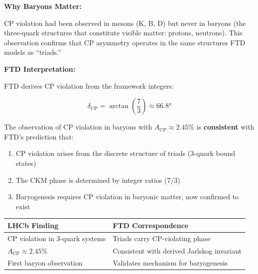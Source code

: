 \documentclass[
  11pt,
  letterpaper,
  twoside,
  openright]{book}
\providecommand{\tightlist}{%
  \setlength{\itemsep}{0pt}\setlength{\parskip}{0pt}}
\begin{document}
\textbf{Why Baryons Matter:}

CP violation had been observed in mesons (K, B, D) but never in baryons
(the three-quark structures that constitute visible matter: protons,
neutrons). This observation confirms that CP asymmetry operates in the
same structures FTD models as ``triads.''

\textbf{FTD Interpretation:}

FTD derives CP violation from the framework integers:

\[\delta_{\text{CP}} = \arctan\left(\frac{7}{3}\right) \approx 66.8°\]

The observation of CP violation in baryons with
\(A_{\text{CP}} \approx 2.45\%\) is \textbf{consistent} with FTD's
prediction that:

\begin{enumerate}
\def\labelenumi{\arabic{enumi}.}
\tightlist
\item
  CP violation arises from the discrete structure of triads (3-quark
  bound states)
\item
  The CKM phase is determined by integer ratios (7/3)
\item
  Baryogenesis requires CP violation in baryonic matter, now confirmed
  to exist
\end{enumerate}

\begin{longtable}[]{@{}
  >{\raggedright\arraybackslash}p{}
  >{\raggedright\arraybackslash}p{}@{}}
\toprule\noalign{}
\begin{minipage}[b]{\linewidth}\raggedright
LHCb Finding
\end{minipage} & \begin{minipage}[b]{\linewidth}\raggedright
FTD Correspondence
\end{minipage} \\
\midrule\noalign{}
\endhead
\bottomrule\noalign{}
\endlastfoot
CP violation in 3-quark systems & Triads carry CP-violating phase \\
\(A_{\text{CP}} \approx 2.45\%\) & Consistent with derived Jarlskog
invariant \\
First baryon observation & Validates mechanism for baryogenesis \\
\end{longtable}
\end{document}
